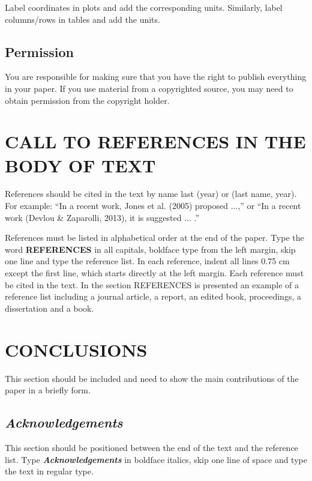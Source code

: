 \documentclass[12pt,fleqn]{article}
\begin{document}
Label coordinates in plots and add the corresponding units. Similarly, label columns/rows in tables and add the units.

\subsection{Permission}
You are responsible for making sure that you have the right to publish everything in your paper. If you use material from a copyrighted source, you may need to obtain permission from the copyright holder.

\section{CALL TO REFERENCES IN THE BODY OF TEXT}
References should be cited in the text by name last (year) or (last name, year). For example: ``In a recent work, Jones et al. (2005) proposed ...,'' or ``In a recent work (Devlou \& Zaparolli, 2013), it is suggested ... .''

References must be listed in alphabetical order at the end of the paper. Type the word \textbf{REFERENCES} in all capitals, boldface type from the left margin, skip one line and type the reference list. In each reference, indent all lines 0.75 cm except the first line, which starts directly at the left margin. Each reference must be cited in the text. In the section REFERENCES is presented an example of a reference list including a journal article, a report, an edited book, proceedings, a dissertation and a book.

\section{CONCLUSIONS}
This section should be included and need to show the main contributions of the paper in a briefly form.

\subsection*{\textit{Acknowledgements}}
This section should be positioned between the end of the text and the reference list. Type \textbf{\textit{Acknowledgements}} in boldface italics, skip one line of space and type the text in regular type.
\end{document}
